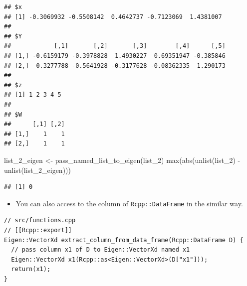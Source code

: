 \documentclass[
]{book}
\newenvironment{Shaded}{\begin{snugshade}}{\end{snugshade}}
\newcommand{\CommentTok}[1]{\textcolor[rgb]{0.56,0.35,0.01}{\textit{#1}}}
\newcommand{\FunctionTok}[1]{\textcolor[rgb]{0.00,0.00,0.00}{#1}}
\newcommand{\NormalTok}[1]{#1}
\newcommand{\OtherTok}[1]{\textcolor[rgb]{0.56,0.35,0.01}{#1}}
\newcommand{\SpecialCharTok}[1]{\textcolor[rgb]{0.00,0.00,0.00}{#1}}
\providecommand{\tightlist}{%
  \setlength{\itemsep}{0pt}\setlength{\parskip}{0pt}}
\begin{document}
\begin{Shaded}
\end{Shaded}

\begin{verbatim}
## $x
## [1] -0.3069932 -0.5508142  0.4642737 -0.7123069  1.4381007
## 
## $Y
##            [,1]       [,2]       [,3]        [,4]      [,5]
## [1,] -0.6159179 -0.3978828  1.4930227  0.69351947 -0.385846
## [2,]  0.3277788 -0.5641928 -0.3177628 -0.08362335  1.290173
## 
## $z
## [1] 1 2 3 4 5
## 
## $W
##      [,1] [,2]
## [1,]    1    1
## [2,]    1    1
\end{verbatim}

\begin{Shaded}
\begin{Highlighting}[]
\NormalTok{list\_2\_eigen }\OtherTok{\textless{}{-}} \FunctionTok{pass\_named\_list\_to\_eigen}\NormalTok{(list\_2)}
\FunctionTok{max}\NormalTok{(}\FunctionTok{abs}\NormalTok{(}\FunctionTok{unlist}\NormalTok{(list\_2) }\SpecialCharTok{{-}} \FunctionTok{unlist}\NormalTok{(list\_2\_eigen)))}
\end{Highlighting}
\end{Shaded}

\begin{verbatim}
## [1] 0
\end{verbatim}

\begin{itemize}
\tightlist
\item
  You can also access to the column of \texttt{Rcpp::DataFrame} in the similar way.
\end{itemize}

\begin{verbatim}
// src/functions.cpp
// [[Rcpp::export]]
Eigen::VectorXd extract_column_from_data_frame(Rcpp::DataFrame D) {
  // pass column x1 of D to Eigen::VectorXd named x1
  Eigen::VectorXd x1(Rcpp::as<Eigen::VectorXd>(D["x1"]));
  return(x1);
}
\end{verbatim}
\end{document}
